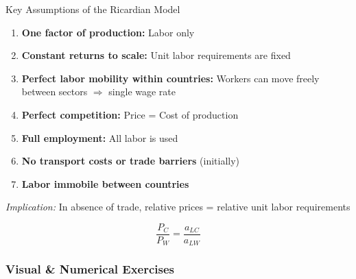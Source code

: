\documentclass{beamer}
\begin{document}
\begin{frame}{Key Assumptions of the Ricardian Model}

\begin{enumerate}
    \item \textbf{One factor of production:} Labor only
    
    \vspace{0.2cm}
    
    \item \textbf{Constant returns to scale:} Unit labor requirements are fixed
    
    \vspace{0.2cm}
    
    \item \textbf{Perfect labor mobility within countries:} Workers can move freely between sectors $\Rightarrow$ single wage rate
    
    \vspace{0.2cm}
    
    \item \textbf{Perfect competition:} Price = Cost of production
    
    \vspace{0.2cm}
    
    \item \textbf{Full employment:} All labor is used
    
    \vspace{0.2cm}
    
    \item \textbf{No transport costs or trade barriers} (initially)
    
    \vspace{0.2cm}
    
    \item \textbf{Labor immobile between countries}
\end{enumerate}

\vspace{0.3cm}

\textit{Implication:} In absence of trade, relative prices = relative unit labor requirements

$$\frac{P_C}{P_W} = \frac{a_{LC}}{a_{LW}}$$

\end{frame}



\subsubsection{Visual \& Numerical Exercises}
\end{document}
